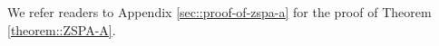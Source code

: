 
\vspace{-1mm}

We refer readers to Appendix \ref{sec::proof-of-zspa-a} for the proof of Theorem \ref{theorem::ZSPA-A}. 






